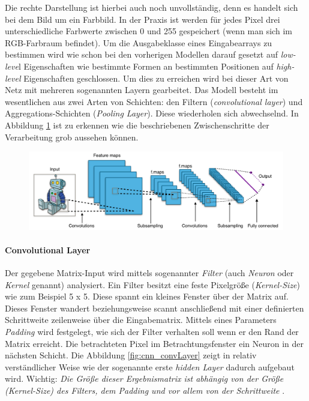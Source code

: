 Die rechte Darstellung ist hierbei auch noch unvollständig, denn es handelt sich bei dem Bild um ein Farbbild. In der Praxis ist werden für jedes Pixel drei unterschiedliche Farbwerte zwischen 0 und 255 gespeichert (wenn man sich im RGB-Farbraum befindet). Um die Ausgabeklasse eines Eingabearrays zu bestimmen wird wie schon bei den vorherigen Modellen darauf gesetzt auf \emph{low-leve}l Eigenschaften wie bestimmte Formen an bestimmten Positionen auf \emph{high-level} Eigenschaften geschlossen. Um dies zu erreichen wird bei dieser Art von Netz mit mehreren sogenannten Layern gearbeitet. Das Modell besteht im wesentlichen aus zwei Arten von Schichten: den Filtern (\emph{convolutional layer}) und Aggregations-Schichten (\emph{Pooling Layer}). Diese wiederholen sich abwechselnd. In Abbildung \ref{fig:cnnOverview} ist zu erkennen wie die beschriebenen Zwischenschritte der Verarbeitung grob aussehen können. 

\begin{figure}[!htb]
	\centering
	\includegraphics[width=.9\linewidth]{img/cnn_overview}
	\label{fig:cnnOverview}
\end{figure}

\paragraph{Convolutional Layer}
Der gegebene Matrix-Input wird mittels sogenannter \emph{Filter} (auch \emph{Neuron} oder \emph{Kernel} genannt) analysiert. Ein Filter besitzt eine feste Pixelgröße (\emph{Kernel-Size}) wie zum Beispiel 5 x 5. Diese spannt ein kleines \glqq Fenster \grqq über der Matrix auf. Dieses Fenster wandert beziehungsweise scannt anschließend mit einer definierten Schrittweite zeilenweise über die Eingabematrix. Mittels eines Parameters \emph{Padding} wird festgelegt, wie sich der Filter verhalten soll wenn er den Rand der Matrix erreicht. Die betrachteten Pixel im Betrachtungsfenster ein Neuron in der nächsten Schicht. Die Abbildung \ref{fig:cnn_convLayer} zeigt in relativ verständlicher Weise wie der sogenannte erste \emph{hidden Layer} dadurch aufgebaut wird. Wichtig: \emph{Die Größe dieser Ergebnismatrix ist abhängig von der Größe (Kernel-Size) des Filters, dem Padding und vor allem von der Schrittweite} \cite{cnnFunktionsweise2}. 


